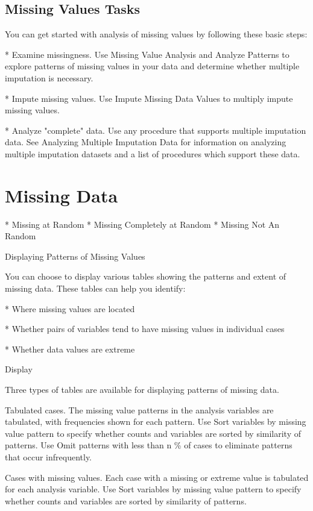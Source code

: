 \subsection{Missing Values Tasks}

You can get started with analysis of missing values by following these basic steps:

\begin{enumerate}
*   Examine missingness. Use Missing Value Analysis and Analyze Patterns to explore patterns of missing values in your data and determine whether multiple imputation is necessary.

*  Impute missing values. Use Impute Missing Data Values to multiply impute missing values.

*  Analyze "complete" data. Use any procedure that supports multiple imputation data. See Analyzing Multiple Imputation Data for information on analyzing multiple imputation datasets and a list of procedures which support these data.
\end{enumerate}

\section{Missing Data}


*  Missing at Random
*  Missing Completely at Random
*  Missing Not An Random

Displaying Patterns of Missing Values

You can choose to display various tables showing the patterns and extent of missing data. These tables can help you identify:


*  Where missing values are located

*  Whether pairs of variables tend to have missing values in individual cases

*  Whether data values are extreme


Display

Three types of tables are available for displaying patterns of missing data.

Tabulated cases. The missing value patterns in the analysis variables are tabulated, with frequencies shown for each pattern. Use Sort variables by missing value pattern to specify whether counts and variables are sorted by similarity of patterns. Use Omit patterns with less than n \% of cases to eliminate patterns that occur infrequently.

Cases with missing values. Each case with a missing or extreme value is tabulated for each analysis variable. Use Sort variables by missing value pattern to specify whether counts and variables are sorted by similarity of patterns.

